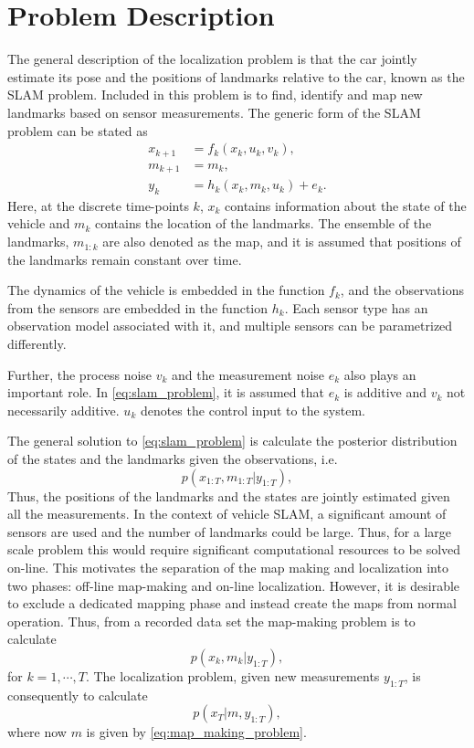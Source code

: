 \section{Problem Description}


The general description of the localization problem is that the car
jointly estimate its pose and the positions of landmarks relative to
the car, known as the \gls{SLAM} problem. Included in this problem is
to find, identify and map new landmarks based on sensor
measurements. The generic form of the \gls{SLAM} problem can be stated
as
\begin{subequations}\label{eq:slam_problem}
  \begin{align}
    x_{k+1} & = f_k(x_k, u_k,v_k), \\
    m_{k+1} & = m_k, \\
    y_k & = h_k(x_k, m_k, u_k) + e_k.
  \end{align}
\end{subequations}
Here, at the discrete time-points $k$, $x_k$ contains information about
the state of the vehicle and $m_k$ contains the location of the
landmarks. The ensemble of the landmarks, $m_{1:k}$ are also denoted as the map,
and it is assumed that positions of the landmarks remain constant over
time.

The dynamics of the vehicle is embedded in the function $f_k$, and the observations from the sensors are embedded in the function $h_k$. Each sensor type has an observation model associated with it, and multiple sensors can be parametrized differently.

Further, the process noise $v_k$ and the measurement noise $e_k$ also plays an important role. In \eqref{eq:slam_problem}, it is assumed that $e_k$ is additive and $v_k$ not necessarily additive. $u_k$ denotes the control input to the system.

The general solution to \eqref{eq:slam_problem} is calculate the posterior distribution of the states and the landmarks given the observations, i.e.
\begin{equation}\label{eq:posterior}
p(x_{1:T}, m_{1:T} | y_{1:T}),
\end{equation}
Thus, the positions of the landmarks and the states are jointly
estimated given all the measurements. In the context of vehicle \gls{SLAM}, a significant amount of sensors are used and the number of landmarks could be large. Thus, for a large scale problem this would require significant computational resources to be solved on-line. This motivates the separation of the map making and
localization into two phases: off-line map-making and on-line localization. However, it is desirable to exclude a dedicated mapping phase and instead create the maps from normal operation. Thus, from a recorded data set the map-making problem is to calculate
\begin{equation}\label{eq:map_making_problem}
p(x_{k}, m_{k} | y_{1:T}),
\end{equation}
for $k = 1, \cdots, T$. The localization problem, given new measurements $y_{1:T}$, is consequently to calculate
$$
p(x_{T}| m ,  y_{1:T}),
$$
where now $m$ is given by \eqref{eq:map_making_problem}.

